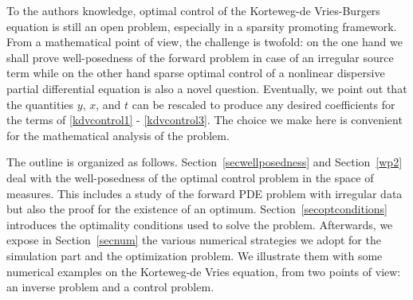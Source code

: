 To the authors knowledge, optimal control of the Korteweg-de Vries-Burgers equation is still an open problem, especially in a sparsity promoting framework. From a mathematical point of view, the challenge is twofold: on the one hand we shall prove well-posedness of the forward problem in case of an irregular source term while on the other hand sparse optimal control of a nonlinear dispersive partial differential equation is also a novel question. Eventually, we point out that the quantities $y$, $x$, and $t$ can be rescaled to produce any desired coefficients for the terms of \eqref{kdvcontrol1} - \eqref{kdvcontrol3}. The choice we make here is convenient for the mathematical analysis of the problem.

The outline is organized as follows. Section~\ref{secwellposedness} and Section~\ref{wp2} deal with the well-posedness of the optimal control problem in the space of measures. This includes a study of the forward PDE problem with irregular data but also the proof for the existence of an optimum. Section~\ref{secoptconditions} introduces the optimality conditions used to solve the problem. Afterwards, we expose in Section~\ref{secnum} the various numerical strategies we adopt for the simulation part and the optimization problem. We illustrate them with some numerical examples on the Korteweg-de Vries equation, from two points of view: an inverse problem and a control problem.

